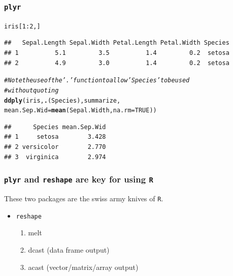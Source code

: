 \documentclass{beamer}\usepackage[]{graphicx}\usepackage[]{color}
\makeatletter
\newcommand{\hlnum}[1]{\textcolor[rgb]{0.686,0.059,0.569}{#1}}%
\newcommand{\hlcom}[1]{\textcolor[rgb]{0.678,0.584,0.686}{\textit{#1}}}%
\newcommand{\hlopt}[1]{\textcolor[rgb]{0,0,0}{#1}}%
\newcommand{\hlstd}[1]{\textcolor[rgb]{0.345,0.345,0.345}{#1}}%
\newcommand{\hlkwc}[1]{\textcolor[rgb]{0.333,0.667,0.333}{#1}}%
\newcommand{\hlkwd}[1]{\textcolor[rgb]{0.737,0.353,0.396}{\textbf{#1}}}%
\newenvironment{kframe}{%
 \def\at@end@of@kframe{}%
 \ifinner\ifhmode%
  \def\at@end@of@kframe{\end{minipage}}%
  \begin{minipage}{\columnwidth}%
 \fi\fi%
 \def\FrameCommand##1{\hskip\@totalleftmargin \hskip-\fboxsep
 \colorbox{shadecolor}{##1}\hskip-\fboxsep
     \hskip-\linewidth \hskip-\@totalleftmargin \hskip\columnwidth}%
 \MakeFramed {\advance\hsize-\width
   \@totalleftmargin\z@ \linewidth\hsize
   \@setminipage}}%
 {\par\unskip\endMakeFramed%
 \at@end@of@kframe}
\newenvironment{knitrout}{}{} %
\makeatother
\begin{document}
\begin{frame}[fragile]
\frametitle{\texttt{plyr}}
\begin{knitrout}\footnotesize
{}\color{fgcolor}\begin{kframe}
\begin{alltt}
\hlstd{iris[}\hlnum{1}\hlopt{:}\hlnum{2}\hlstd{, ]}
\end{alltt}
\begin{verbatim}
##   Sepal.Length Sepal.Width Petal.Length Petal.Width Species
## 1          5.1         3.5          1.4         0.2  setosa
## 2          4.9         3.0          1.4         0.2  setosa
\end{verbatim}
\begin{alltt}
\hlcom{# Note the use of the '.' function to allow 'Species' to be used }
\hlcom{# without quoting}
\hlkwd{ddply}\hlstd{(iris,} \hlkwd{.}\hlstd{(Species), summarize,}
      \hlkwc{mean.Sep.Wid} \hlstd{=} \hlkwd{mean}\hlstd{(Sepal.Width,} \hlkwc{na.rm} \hlstd{=} \hlnum{TRUE}\hlstd{))}
\end{alltt}
\begin{verbatim}
##      Species mean.Sep.Wid
## 1     setosa        3.428
## 2 versicolor        2.770
## 3  virginica        2.974
\end{verbatim}
\end{kframe}
\end{knitrout}
\end{frame}



\begin{frame}[fragile]
\frametitle{\texttt{plyr} and \texttt{reshape} are key for using \texttt{R}}
These two packages are the swiss army knives of \texttt{R}.
\begin{itemize}
    \item \texttt{reshape}
    \begin{enumerate}
    \item melt
    \item dcast (data frame output)
    \item acast (vector/matrix/array output)
    \end{enumerate}
\end{itemize}
\end{frame}

\end{document}
